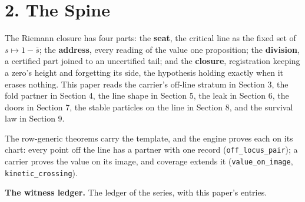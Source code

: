 \documentclass[10pt]{article}
\begin{document}
\hypertarget{the-spine}{%
\section{2. The Spine}\label{the-spine}}

The Riemann closure has four parts: the \textbf{seat}, the critical line
as the fixed set of \(s\mapsto1-\bar s\); the \textbf{address}, every
reading of the value one proposition; the \textbf{division}, a certified
part joined to an uncertified tail; and the \textbf{closure},
registration keeping a zero's height and forgetting its side, the
hypothesis holding exactly when it erases nothing. This paper reads the
carrier's off-line stratum in Section 3, the fold partner in Section 4,
the line shape in Section 5, the leak in Section 6, the doors in Section
7, the stable particles on the line in Section 8, and the survival law
in Section 9.

The row-generic theorems carry the template, and the engine proves each
on its chart: every point off the line has a partner with one record
(\texttt{off\_locus\_pair}); a carrier proves the value on its image,
and coverage extends it (\texttt{value\_on\_image},
\texttt{kinetic\_crossing}).

\textbf{The witness ledger.} The ledger of the series, with this paper's
entries.

\begingroup\scriptsize
\end{document}
